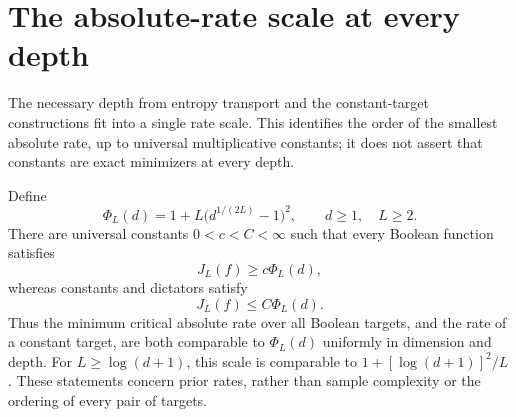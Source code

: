\section{The absolute-rate scale at every depth}
\label{sec:critical-depth-profile}

The necessary depth from entropy transport and the constant-target
constructions fit into a single rate scale. This identifies the order
of the smallest absolute rate, up to universal multiplicative constants;
it does not assert that constants are exact minimizers at every depth.

\begin{theorem}
\label{thm:critical-depth-profile}
Define
\[
 \Phi_L(d)=1+L\bigl(d^{1/(2L)}-1\bigr)^2,
 \qquad d\ge1,\quad L\ge2.
\]
There are universal constants $0<c<C<\infty$ such that every Boolean
function satisfies
\[
 J_L(f)\ge c\Phi_L(d),
\]
whereas constants and dictators satisfy
\[
 J_L(f)\le C\Phi_L(d).
\]
Thus the minimum critical absolute rate over all Boolean targets,
and the rate of a constant target, are both comparable to
$\Phi_L(d)$ uniformly in dimension and depth.
For $L\ge\log(d+1)$, this scale is comparable to
$1+[\log(d+1)]^2/L$. These statements concern prior rates, rather
than sample complexity or the ordering of every pair of targets.
\end{theorem}

